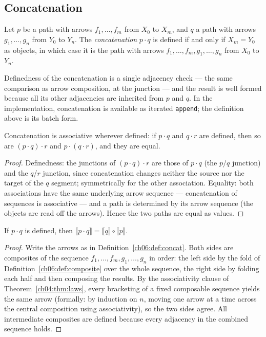 \subsection{Concatenation}

\begin{definition}[Concatenation]
\label{ch06:def:concat}
Let $p$ be a path with arrows $f_1, \dots, f_m$ from $X_0$ to $X_m$, and
$q$ a path with arrows $g_1, \dots, g_n$ from $Y_0$ to $Y_n$. The
\emph{concatenation} $p \cdot q$ is defined if and only if $X_m = Y_0$ as
objects, in which case it is the path with arrows
$f_1, \dots, f_m, g_1, \dots, g_n$ from $X_0$ to $Y_n$.
\end{definition}

Definedness of the concatenation is a single adjacency check --- the same
comparison as arrow composition, at the junction --- and the result is
well formed because all its other adjacencies are inherited from $p$ and
$q$. In the implementation, concatenation is available as iterated
\texttt{append}; the definition above is its batch form.

\begin{proposition}
\label{ch06:prop:semicat}
Concatenation is associative wherever defined: if $p \cdot q$ and
$q \cdot r$ are defined, then so are $(p \cdot q) \cdot r$ and
$p \cdot (q \cdot r)$, and they are equal.
\end{proposition}

\begin{proof}
Definedness: the junctions of $(p \cdot q) \cdot r$ are those of
$p \cdot q$ (the $p$/$q$ junction) and the $q$/$r$ junction, since
concatenation changes neither the source nor the target of the $q$
segment; symmetrically for the other association. Equality: both
associations have the same underlying arrow sequence --- concatenation of
sequences is associative --- and a path is determined by its arrow
sequence (the objects are read off the arrows). Hence the two paths are
equal as values.
\end{proof}

\begin{proposition}
\label{ch06:prop:evalconcat}
If $p \cdot q$ is defined, then
$\llbracket p \cdot q \rrbracket = \llbracket q \rrbracket \circ
\llbracket p \rrbracket$.
\end{proposition}

\begin{proof}
Write the arrows as in Definition~\ref{ch06:def:concat}. Both sides are
composites of the sequence $f_1, \dots, f_m, g_1, \dots, g_n$ in order:
the left side by the fold of Definition~\ref{ch06:def:composite} over the
whole sequence, the right side by folding each half and then composing the
results. By the associativity clause of Theorem~\ref{ch04:thm:laws},
every bracketing of a fixed composable sequence yields the same arrow
(formally: by induction on $n$, moving one arrow at a time across the
central composition using associativity), so the two sides agree. All
intermediate composites are defined because every adjacency in the
combined sequence holds.
\end{proof}

